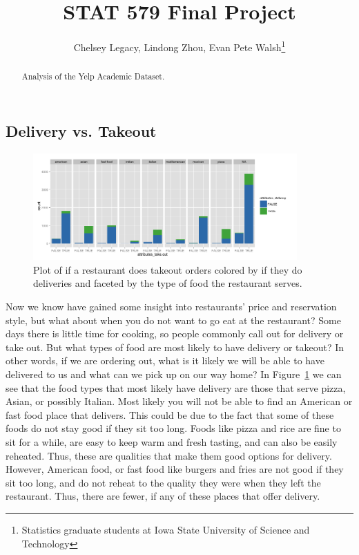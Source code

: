 \documentclass[11pt]{article}
\begin{document}
\author{Chelsey Legacy, Lindong Zhou, Evan Pete Walsh\footnote{Statistics graduate students at Iowa State University of Science and Technology}}
\title{STAT 579 Final Project}
\maketitle

\begin{abstract}
Analysis of the Yelp Academic Dataset.
\end{abstract}

\newpage

\tableofcontents

\newpage

\pagestyle{fancy}
\rhead{\thepage}
\rfoot{\today}
\cfoot{}%


\subsection{Delivery vs. Takeout}

\begin{figure}[h!]
  \caption{Plot of if a restaurant does takeout orders colored by if they do deliveries and faceted by the type of food the restaurant serves.}
  \centering
  \label{takeout}
    \includegraphics[width=0.9\textwidth]{Figures/takeoutdelivery.png}
\end{figure}
Now we know have gained some insight into restaurants' price and reservation style, but what about when you do not want to go eat at the restaurant? Some days there is little time for cooking, so people commonly call out for delivery or take out.  But what types of food are most likely to have delivery or takeout?  In other words, if we are ordering out, what is it likely we will be able to have delivered to us and what can we pick up on our way home? In 
Figure~\ref{takeout} we can see that the food types that most likely have delivery are those that serve pizza, Asian, or possibly Italian.  Most likely you will not be able to find an American or fast food place that delivers.  This could be due to the fact that some of these foods do not stay good if they sit too long.  Foods like pizza and rice are fine to sit for a while,  are easy to keep warm and fresh tasting, and can also be easily reheated. Thus, these are qualities that make them good options for delivery.  However, American food, or fast food like burgers and fries are not good if they sit too long, and do not reheat to the quality they were when they left the restaurant.  Thus, there are fewer, if any of these places that offer delivery.
\end{document}
